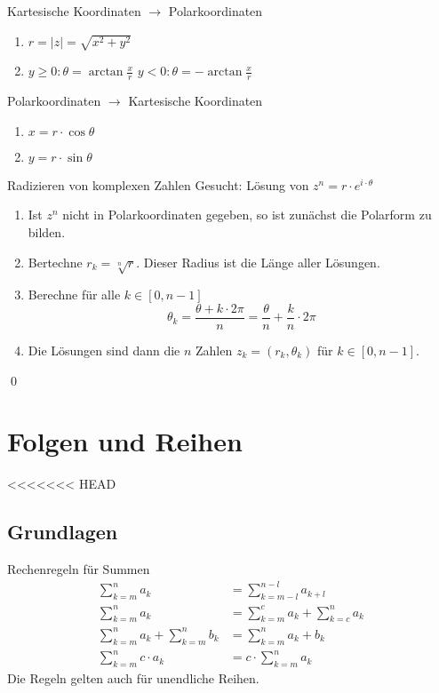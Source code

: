 \documentclass[german]{spicker}
\renewcommand{\abs}[1]{\left| #1 \right|}
\begin{document}
\begin{algo}{Kartesische Koordinaten $\to$ Polarkoordinaten}
    \begin{enumerate}
        \item $r = \abs{z} = \sqrt{x^2 + y^2}$
        \item
              \subitem $y \geq 0 : \theta = \arctan \frac{x}{r}$
              \subitem $y < 0 : \theta = -\arctan \frac{x}{r}$
    \end{enumerate}
\end{algo}

\begin{algo}{Polarkoordinaten $\to$ Kartesische Koordinaten}
    \begin{enumerate}
        \item $x = r \cdot \cos \theta$
        \item $y = r \cdot \sin \theta$
    \end{enumerate}
\end{algo}

\begin{algo}{Radizieren von komplexen Zahlen}
    Gesucht: Lösung von $z^n = r \cdot e^{i\cdot \theta}$
    \begin{enumerate}
        \item Ist $z^n$ nicht in Polarkoordinaten gegeben, so ist zunächst die Polarform zu bilden.
        \item Bertechne $r_k = \sqrt[n]{r}$. Dieser Radius ist die Länge aller Lösungen.
        \item Berechne für alle $k \in [0, n-1]$
              $$
                  \theta_k = \frac{\theta + k\cdot 2\pi}{n} = \frac{\theta}{n} + \frac{k}{n} \cdot 2\pi
              $$
        \item Die Lösungen sind dann die $n$ Zahlen $z_k = (r_k, \theta_k)$ für $k \in [0, n-1]$.
    \end{enumerate}
    \qed
\end{algo}

\section{Folgen und Reihen}

<<<<<<< HEAD
\subsection{Grundlagen}
\begin{bonus}{Rechenregeln für Summen}
    $$
        \begin{aligned}
            \sum_{k=m}^n a_k                    & = \sum_{k=m-l}^{n-l} a_{k+l}          \\
            \sum_{k=m}^n a_k                    & = \sum_{k=m}^c a_k + \sum_{k=c}^n a_k \\
            \sum_{k=m}^n a_k + \sum_{k=m}^n b_k & = \sum_{k=m}^n a_k + b_k              \\
            \sum_{k=m}^n c\cdot a_k             & = c\cdot\sum_{k=m}^n a_k
        \end{aligned}
    $$
    Die Regeln gelten auch für unendliche Reihen.
\end{bonus}
\end{document}
